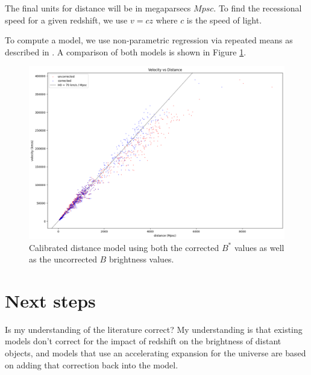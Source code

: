 \documentclass{article}
\begin{document}
The final units for distance will be in megaparsecs $Mpsc$. To find the
recessional speed for a given redshift, we use $v = cz$ where $c$ is the speed
of light.

To compute a model, we use non-parametric regression via repeated means as described in
\citet{siegel1982}. A comparison of both models is shown in Figure \ref{fig:calibrated}.

\begin{figure}[h!]
  \includegraphics[width=\linewidth]{../graphs/both_calibrated_velocity_vs_distance.png}
  \caption{Calibrated distance model using both the corrected $B^*$ values as
  well as the uncorrected $B$ brightness values.}
  \label{fig:calibrated}
\end{figure}


\section{Next steps}
\label{sec:nextsteps}

Is my understanding of the literature correct? My understanding is that
existing models don't correct for the impact of redshift on the brightness of
distant objects, and models that use an accelerating expansion for the universe
are based on adding that correction back into the model.



\end{document}

